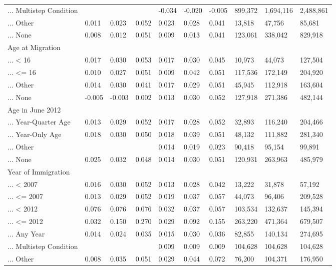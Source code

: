 \documentclass[
  letterpaper,
  DIV=11,
  numbers=noendperiod]{scrartcl}
\begin{document}
\begin{table}[!htbp]
{\begin{tabular}{llllllllll}
... Multistep Condition &  &  &  & -0.034 & -0.020 & -0.005 & 899,372 & 1,694,116 & 2,488,861 \\ 
... Other & 0.011 & 0.023 & 0.052 & 0.023 & 0.028 & 0.041 & 13,818 & 47,756 & 85,681 \\ 
... None & 0.008 & 0.012 & 0.051 & 0.009 & 0.013 & 0.041 & 123,061 & 338,042 & 829,918 \\ 
Age at Migration &  &  &  &  &  &  &  &  &  \\ 
... < 16 & 0.017 & 0.030 & 0.053 & 0.017 & 0.030 & 0.045 & 10,973 & 44,073 & 127,504 \\ 
... <= 16 & 0.010 & 0.027 & 0.051 & 0.009 & 0.042 & 0.051 & 117,536 & 172,149 & 204,920 \\ 
... Other & 0.014 & 0.030 & 0.041 & 0.017 & 0.029 & 0.051 & 45,945 & 112,918 & 163,604 \\ 
... None & -0.005 & -0.003 & 0.002 & 0.013 & 0.030 & 0.052 & 127,918 & 271,386 & 482,144 \\ 
Age in June 2012 &  &  &  &  &  &  &  &  &  \\ 
... Year-Quarter Age & 0.013 & 0.029 & 0.052 & 0.017 & 0.028 & 0.052 & 32,893 & 116,240 & 204,466 \\ 
... Year-Only Age & 0.018 & 0.030 & 0.050 & 0.018 & 0.039 & 0.051 & 48,132 & 111,882 & 281,340 \\ 
... Other &  &  &  & 0.014 & 0.019 & 0.023 & 90,418 & 95,154 & 99,891 \\ 
... None & 0.025 & 0.032 & 0.048 & 0.014 & 0.030 & 0.051 & 120,931 & 263,963 & 485,979 \\ 
Year of Immigration &  &  &  &  &  &  &  &  &  \\ 
... < 2007 & 0.016 & 0.030 & 0.052 & 0.013 & 0.028 & 0.042 & 13,222 & 31,878 & 57,192 \\ 
... <= 2007 & 0.013 & 0.029 & 0.052 & 0.019 & 0.037 & 0.057 & 44,073 & 96,406 & 209,528 \\ 
... < 2012 & 0.076 & 0.076 & 0.076 & 0.032 & 0.037 & 0.057 & 103,534 & 132,637 & 145,394 \\ 
... <= 2012 & 0.032 & 0.150 & 0.270 & 0.029 & 0.092 & 0.155 & 263,220 & 471,364 & 679,507 \\ 
... Any Year & 0.014 & 0.024 & 0.035 & 0.015 & 0.030 & 0.036 & 82,855 & 140,134 & 274,695 \\ 
... Multistep Condition &  &  &  & 0.009 & 0.009 & 0.009 & 104,628 & 104,628 & 104,628 \\ 
... Other & 0.008 & 0.035 & 0.051 & 0.029 & 0.044 & 0.072 & 76,200 & 104,371 & 176,950 \\ 

\end{tabular}}
\end{table}
\end{document}
